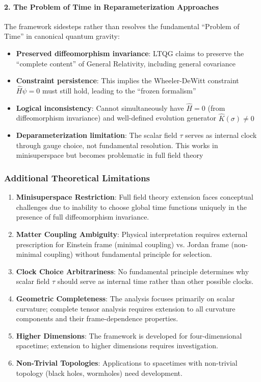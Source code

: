 \paragraph{2. The Problem of Time in Reparameterization Approaches}
The framework sidesteps rather than resolves the fundamental ``Problem of Time'' in canonical quantum gravity:

\begin{itemize}
\item \textbf{Preserved diffeomorphism invariance}: LTQG claims to preserve the ``complete content'' of General Relativity, including general covariance
\item \textbf{Constraint persistence}: This implies the Wheeler-DeWitt constraint $\hat{H}\psi = 0$ must still hold, leading to the ``frozen formalism''
\item \textbf{Logical inconsistency}: Cannot simultaneously have $\hat{H} = 0$ (from diffeomorphism invariance) and well-defined evolution generator $\hat{K}(\sigma) \neq 0$
\item \textbf{Deparameterization limitation}: The scalar field $\tau$ serves as internal clock through gauge choice, not fundamental resolution. This works in minisuperspace but becomes problematic in full field theory
\end{itemize}

\subsubsection{Additional Theoretical Limitations}

\begin{enumerate}
\item \textbf{Minisuperspace Restriction}: Full field theory extension faces conceptual challenges due to inability to choose global time functions uniquely in the presence of full diffeomorphism invariance.

\item \textbf{Matter Coupling Ambiguity}: Physical interpretation requires external prescription for Einstein frame (minimal coupling) vs. Jordan frame (non-minimal coupling) without fundamental principle for selection.

\item \textbf{Clock Choice Arbitrariness}: No fundamental principle determines why scalar field $\tau$ should serve as internal time rather than other possible clocks.

\item \textbf{Geometric Completeness}: The analysis focuses primarily on scalar curvature; complete tensor analysis requires extension to all curvature components and their frame-dependence properties.

\item \textbf{Higher Dimensions}: The framework is developed for four-dimensional spacetime; extension to higher dimensions requires investigation.

\item \textbf{Non-Trivial Topologies}: Applications to spacetimes with non-trivial topology (black holes, wormholes) need development.
\end{enumerate}

